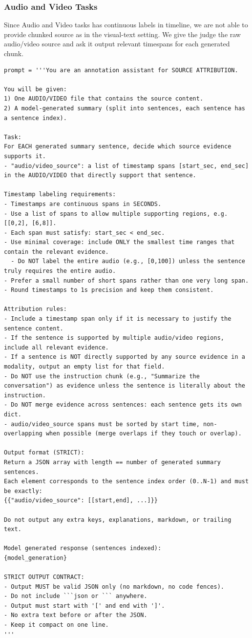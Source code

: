 \subsubsection{Audio and Video Tasks}
Since Audio and Video tasks has continuous labels in timeline, we are not able to provide chunked source as in the visual-text setting. We give the judge the raw audio/video source and ask it output relevant timespans for each generated chunk.

\begin{lstlisting}
prompt = '''You are an annotation assistant for SOURCE ATTRIBUTION.

You will be given:
1) One AUDIO/VIDEO file that contains the source content.
2) A model-generated summary (split into sentences, each sentence has a sentence index).

Task:
For EACH generated summary sentence, decide which source evidence supports it.
- "audio/video_source": a list of timestamp spans [start_sec, end_sec] in the AUDIO/VIDEO that directly support that sentence.

Timestamp labeling requirements:
- Timestamps are continuous spans in SECONDS.
- Use a list of spans to allow multiple supporting regions, e.g. [[0,2], [6,8]].
- Each span must satisfy: start_sec < end_sec.
- Use minimal coverage: include ONLY the smallest time ranges that contain the relevant evidence.
  - Do NOT label the entire audio (e.g., [0,100]) unless the sentence truly requires the entire audio.
- Prefer a small number of short spans rather than one very long span.
- Round timestamps to 1s precision and keep them consistent.

Attribution rules:
- Include a timestamp span only if it is necessary to justify the sentence content.
- If the sentence is supported by multiple audio/video regions, include all relevant evidence.
- If a sentence is NOT directly supported by any source evidence in a modality, output an empty list for that field.
- Do NOT use the instruction chunk (e.g., "Summarize the conversation") as evidence unless the sentence is literally about the instruction.
- Do NOT merge evidence across sentences: each sentence gets its own dict.
- audio/video_source spans must be sorted by start time, non-overlapping when possible (merge overlaps if they touch or overlap).

Output format (STRICT):
Return a JSON array with length == number of generated summary sentences.
Each element corresponds to the sentence index order (0..N-1) and must be exactly:
{{"audio/video_source": [[start,end], ...]}}

Do not output any extra keys, explanations, markdown, or trailing text.

Model generated response (sentences indexed):
{model_generation}

STRICT OUTPUT CONTRACT:
- Output MUST be valid JSON only (no markdown, no code fences).
- Do not include ```json or ``` anywhere.
- Output must start with '[' and end with ']'.
- No extra text before or after the JSON.
- Keep it compact on one line.
'''
\end{lstlisting}

